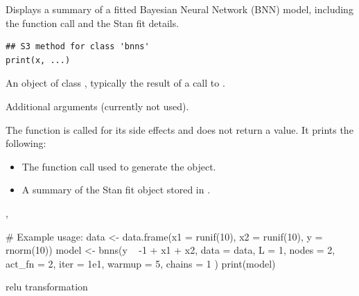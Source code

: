 \documentclass[a4paper]{book}
\begin{document}
%
\begin{Description}
Displays a summary of a fitted Bayesian Neural Network (BNN) model, including the function call and the Stan fit details.
\end{Description}
%
\begin{Usage}
\begin{verbatim}
## S3 method for class 'bnns'
print(x, ...)
\end{verbatim}
\end{Usage}
%
\begin{Arguments}
\begin{ldescription}
\item[\code{x}] An object of class , typically the result of a call to .

\item[\code{...}] Additional arguments (currently not used).
\end{ldescription}
\end{Arguments}
%
\begin{Value}
The function is called for its side effects and does not return a value. It prints the following:
\begin{itemize}

\item{} The function call used to generate the  object.
\item{} A summary of the Stan fit object stored in .

\end{itemize}

\end{Value}
%
\begin{SeeAlso}
, 
\end{SeeAlso}
%
\begin{Examples}
\begin{ExampleCode}

# Example usage:
data <- data.frame(x1 = runif(10), x2 = runif(10), y = rnorm(10))
model <- bnns(y ~ -1 + x1 + x2,
  data = data, L = 1, nodes = 2, act_fn = 2,
  iter = 1e1, warmup = 5, chains = 1
)
print(model)

\end{ExampleCode}
\end{Examples}
%
\begin{Description}
relu transformation
\end{Description}
\end{document}
